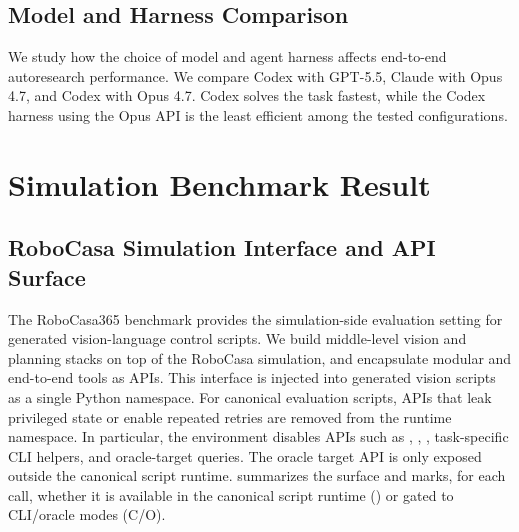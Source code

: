 \subsection{Model and Harness Comparison}

We study how the choice of model and agent harness affects end-to-end autoresearch performance. We compare Codex with GPT-5.5, Claude with Opus 4.7, and Codex with Opus 4.7. Codex solves the task fastest, while the Codex harness using the Opus API is the least efficient among the tested configurations.









\section{Simulation Benchmark Result}
\subsection{RoboCasa Simulation Interface and API Surface}
\label{subsec:robocasa-api-summary}

The RoboCasa365 benchmark provides the simulation-side evaluation setting for generated vision-language control scripts. We build middle-level vision and planning stacks on top of the RoboCasa simulation, and encapsulate modular and end-to-end tools as APIs. This interface is injected into generated vision scripts as a single Python namespace. For canonical evaluation scripts, APIs that leak privileged state or enable repeated retries are removed from the runtime namespace. In particular, the environment disables APIs such as , , , task-specific CLI helpers, and
oracle-target queries. The oracle target API is only exposed outside the canonical script
runtime.  summarizes the surface and marks, for each call, whether it is
available in the canonical script runtime (\checkmark) or gated to CLI/oracle modes
(\textsf{C}/\textsf{O}).

